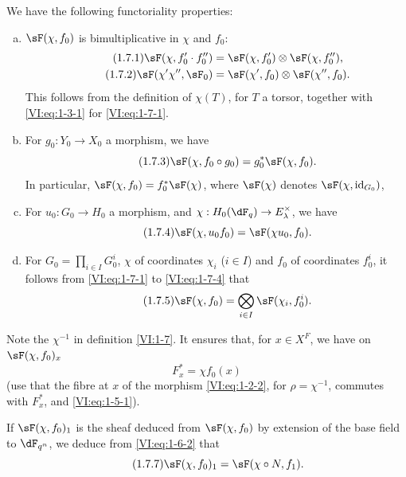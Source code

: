 We have the following functoriality properties:
\begin{enumerate}[a)]
  \item $\sF(\chi,f_0)$ is bimultiplicative in $\chi$ and $f_0$: 
    \begin{align*}\tag{1.7.1}\label{VI:eq:1-7-1}
      \sF(\chi,f_0'\cdot f_0'') &= \sF(\chi,f_0')\otimes \sF(\chi,f_0'') \text{,} \\
      \tag{1.7.2}\label{VI:eq:1-7-2}
      \sF(\chi'\chi'',\sF_0) &= \sF(\chi',f_0)\otimes \sF(\chi'',f_0) \text{.}
    \end{align*}
    This follows from the definition of $\chi(T)$, for $T$ a torsor, together
    with \eqref{VI:eq:1-3-1} for \eqref{VI:eq:1-7-1}.
  \item For $g_0:Y_0\to X_0$ a morphism, we have 
    \begin{equation*}\tag{1.7.3}\label{VI:eq:1-7-3}
      \sF(\chi,f_0\circ g_0) = g_0^\ast \sF(\chi,f_0) \text{.}
    \end{equation*}
    In particular, $\sF(\chi,f_0) = f_0^\ast \sF(\chi)$, where $\sF(\chi)$
    denotes $\sF(\chi,\operatorname{id}_{G_0})$,
  \item For $u_0:G_0\to H_0$ a morphism, and
    $\chi:H_0(\dF_q) \to E_\lambda^\times$, we have 
    \begin{equation*}\tag{1.7.4}\label{VI:eq:1-7-4}
      \sF(\chi,u_0 f_0) = \sF(\chi u_0,f_0) \text{.}
    \end{equation*}
  \item For $G_0=\prod_{i\in I} G_0^i$, $\chi$ of coordinates $\chi_i$
    ($i\in I$) and $f_0$ of coordinates $f_0^i$, it follows from
    \eqref{VI:eq:1-7-1} to \eqref{VI:eq:1-7-4} that 
    \begin{equation*}\tag{1.7.5}\label{VI:eq:1-7-5}
      \sF(\chi,f_0) = \bigotimes_{i\in I} \sF(\chi_i,f_0^i) \text{.}
    \end{equation*}    
\end{enumerate}

Note the $\chi^{-1}$ in definition \ref{VI:1-7}. It ensures that, for
$x\in X^F$, we have on $\sF(\chi,f_0)_x$ 
\begin{equation*}\tag{1.7.6}\label{VI:eq:1-7-6}
  F_x^\ast = \chi f_0(x)
\end{equation*}
(use that the fibre at $x$ of the morphism \eqref{VI:eq:1-2-2}, for
$\rho=\chi^{-1}$, commutes with $F_x^\ast$, and \eqref{VI:eq:1-5-1}).

If $\sF(\chi,f_0)_1$ is the sheaf deduced from $\sF(\chi,f_0)$ by extension
of the base field to $\dF_{q^n}$, we deduce from \eqref{VI:eq:1-6-2} that 
\begin{equation*}\tag{1.7.7}\label{VI:eq:1-7-7}
  \sF(\chi,f_0)_1 = \sF(\chi\circ N,f_1) \text{.}
\end{equation*}





